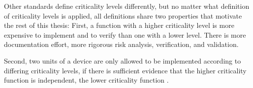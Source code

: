 Other standards define criticality levels differently, but no matter what definition of criticality levels is applied, all definitions share two properties that motivate the rest of this thesis: First, a function with a higher criticality level is more expensive to implement and to verify than one with a lower level. There is more documentation effort, more rigorous risk analysis, verification, and validation. 

Second, two units of a device are only allowed to be implemented according to differing criticality levels, if there is sufficient evidence that the higher criticality function is independent, the lower criticality function \cite{IEC.2000-1}\cite{IEC.2000-2}.  

